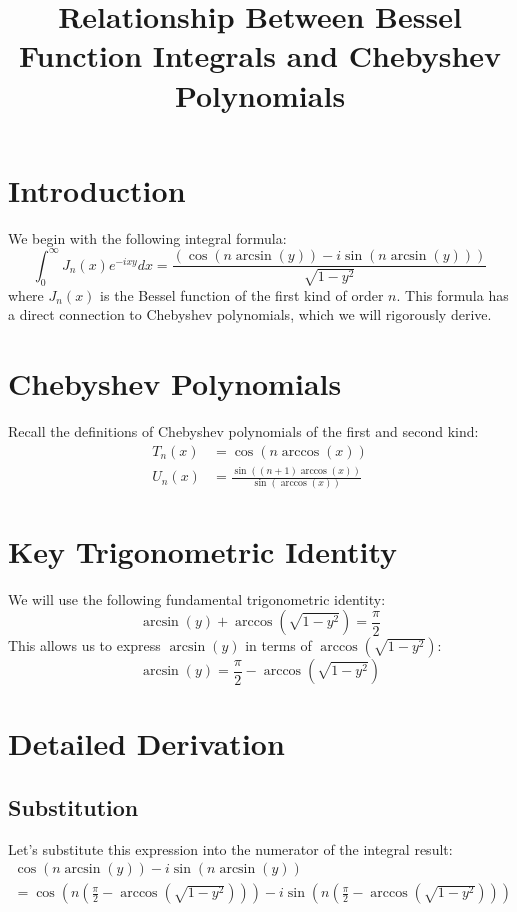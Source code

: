 \documentclass{article}
\begin{document}
\title{Relationship Between Bessel Function Integrals and Chebyshev Polynomials}
\date{}
\maketitle

\section{Introduction}
We begin with the following integral formula:
\begin{equation}
  \int_0^{\infty} J_n (x) e^{- ixy} dx = \frac{(\cos (n \arcsin (y)) - i \sin (n \arcsin (y)))}{\sqrt{1 - y^2}}
\end{equation}
where $J_n (x)$ is the Bessel function of the first kind of order $n$. This formula has a direct connection to Chebyshev polynomials, which we will rigorously derive.

\section{Chebyshev Polynomials}
Recall the definitions of Chebyshev polynomials of the first and second kind:
\begin{align}
  T_n (x) & = \cos (n \arccos (x)) \\
  U_n (x) & = \frac{\sin ((n + 1) \arccos (x))}{\sin (\arccos (x))} 
\end{align}

\section{Key Trigonometric Identity}
We will use the following fundamental trigonometric identity:
\begin{equation}
  \arcsin (y) + \arccos (\sqrt{1 - y^2}) = \frac{\pi}{2}
\end{equation}
This allows us to express $\arcsin (y)$ in terms of $\arccos (\sqrt{1 - y^2})$:
\begin{equation}
  \arcsin (y) = \frac{\pi}{2} - \arccos (\sqrt{1 - y^2})
\end{equation}

\section{Detailed Derivation}
\subsection{Substitution}
Let's substitute this expression into the numerator of the integral result:
\begin{multline}
  \cos (n \arcsin (y)) - i \sin (n \arcsin (y)) \\
  = \cos (n (\frac{\pi}{2} - \arccos (\sqrt{1 - y^2}))) - i \sin (n (\frac{\pi}{2} - \arccos (\sqrt{1 - y^2})))
\end{multline}
\end{document}
